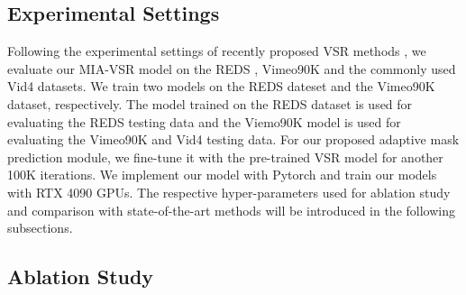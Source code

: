 \documentclass[10pt,twocolumn,letterpaper]{article}
\begin{document}
\subsection{Experimental Settings}
Following the experimental settings of recently proposed VSR methods \cite{shi2022rethinking,liang2022recurrent,liang2022vrt,chan2022basicvsr++,cao2021video}, 
we evaluate our MIA-VSR model on the REDS \cite{nah2019ntire}, Vimeo90K \cite{xue2019video} and the commonly used Vid4 \cite{liu2013bayesian} datasets.
%
We train two models on the REDS dateset and the Vimeo90K dataset, respectively.
%
The model trained on the REDS dataset is used for evaluating the REDS testing data and the Viemo90K model is used for evaluating the Vimeo90K and Vid4 testing data.
%
For our proposed adaptive mask prediction module, we fine-tune it with the pre-trained VSR model for another 100K iterations. 
%
We implement our model with Pytorch and train our models with RTX 4090 GPUs.
%
The respective hyper-parameters used for ablation study and comparison with state-of-the-art methods will be introduced in the following subsections. 


\subsection{Ablation Study}
\label{sec:ablation}
\end{document}
